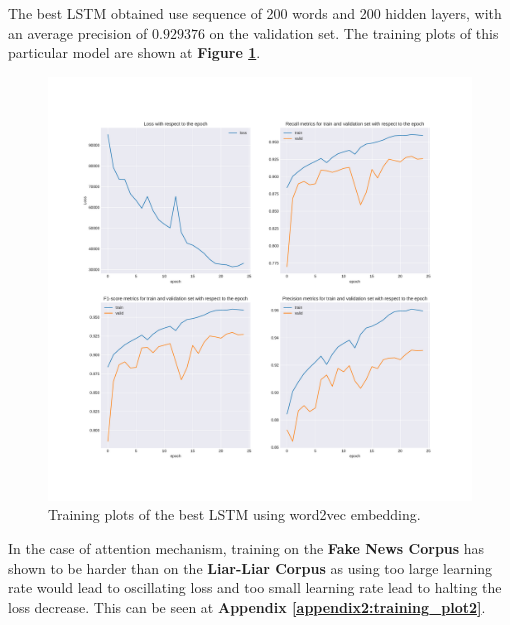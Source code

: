 The best LSTM obtained use sequence of 200 words and 200 hidden layers, with an average precision of $0.929376$ on the validation set. The training plots of this particular model are shown at \textbf{Figure \ref{chap4:fig:lstm5.1}}.\\
\begin{figure}
 \centering
 \includegraphics[width=\textwidth]{images/chapitre4/lstm5}
 \caption{Training plots of the best LSTM using word2vec embedding.}
 \label{chap4:fig:lstm5.1}
\end{figure} 

In the case of attention mechanism, training on the \textbf{Fake News Corpus} has shown to be harder than on the \textbf{Liar-Liar Corpus} as using too large learning rate would lead to oscillating loss and too small learning rate lead to halting the loss decrease. This can be seen at \textbf{Appendix \ref{appendix2:training_plot2}}. \\


